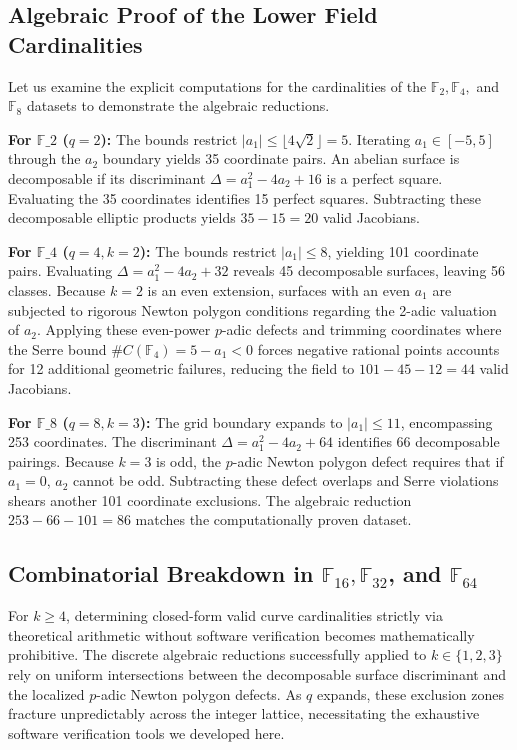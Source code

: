 \documentclass[letterpaper, 11pt]{article}
\begin{document}
\subsection{Algebraic Proof of the Lower Field Cardinalities}
Let us examine the explicit computations for the cardinalities of the $\mathbb{F}_2, \mathbb{F}_4,$ and $\mathbb{F}_8$ datasets to demonstrate the algebraic reductions.

\textbf{For $\mathbb{F}\_2$ ($q=2$):}
The bounds restrict $\vert{}a_1\vert{} \le \lfloor 4\sqrt{2} \rfloor = 5$. Iterating $a_1 \in [-5, 5]$ through the $a_2$ boundary yields 35 coordinate pairs. An abelian surface is decomposable if its discriminant $\Delta = a_1^2 - 4a_2 + 16$ is a perfect square. Evaluating the 35 coordinates identifies 15 perfect squares. Subtracting these decomposable elliptic products yields $35 - 15 = 20$ valid Jacobians.

\textbf{For $\mathbb{F}\_4$ ($q=4, k=2$):}
The bounds restrict $\vert{}a_1\vert{} \le 8$, yielding 101 coordinate pairs. Evaluating $\Delta = a_1^2 - 4a_2 + 32$ reveals 45 decomposable surfaces, leaving 56 classes. Because $k=2$ is an even extension, surfaces with an even $a_1$ are subjected to rigorous Newton polygon conditions regarding the 2-adic valuation of $a_2$. Applying these even-power $p$-adic defects and trimming coordinates where the Serre bound $\#C(\mathbb{F}_4) = 5 - a_1 < 0$ forces negative rational points accounts for 12 additional geometric failures, reducing the field to $101 - 45 - 12 = 44$ valid Jacobians.

\textbf{For $\mathbb{F}\_8$ ($q=8, k=3$):}
The grid boundary expands to $\vert{}a_1\vert{} \le 11$, encompassing 253 coordinates. The discriminant $\Delta = a_1^2 - 4a_2 + 64$ identifies 66 decomposable pairings. Because $k=3$ is odd, the $p$-adic Newton polygon defect requires that if $a_1 = 0$, $a_2$ cannot be odd. Subtracting these defect overlaps and Serre violations shears another 101 coordinate exclusions. The algebraic reduction $253 - 66 - 101 = 86$ matches the computationally proven dataset.

\subsection{Combinatorial Breakdown in \texorpdfstring{$\mathbb{F}_{16}, \mathbb{F}_{32}$}{F\_16, F\_32}, and \texorpdfstring{$\mathbb{F}_{64}$}{F\_64}}
For $k \ge 4$, determining closed-form valid curve cardinalities strictly via theoretical arithmetic without software verification becomes mathematically prohibitive. The discrete algebraic reductions successfully applied to $k \in \{1, 2, 3\}$ rely on uniform intersections between the decomposable surface discriminant and the localized $p$-adic Newton polygon defects. As $q$ expands, these exclusion zones fracture unpredictably across the integer lattice, necessitating the exhaustive software verification tools we developed here.
\end{document}
